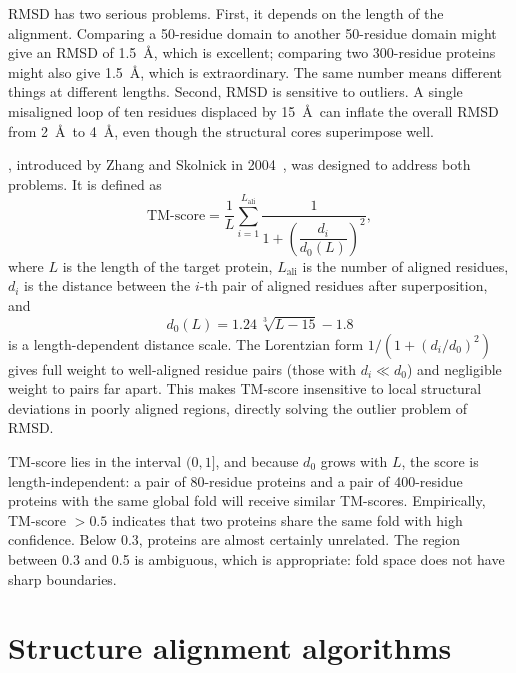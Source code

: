 RMSD has two serious problems. First, it depends on the length of the alignment.
Comparing a 50-residue domain to another 50-residue domain might give an RMSD of
1.5~\AA, which is excellent; comparing two 300-residue proteins might also give
1.5~\AA, which is extraordinary. The same number means different things at
different lengths. Second, RMSD is sensitive to outliers. A single misaligned loop
of ten residues displaced by 15~\AA\ can inflate the overall RMSD from 2~\AA\ to
4~\AA, even though the structural cores superimpose well.

, introduced by Zhang and Skolnick in
2004~\cite{zhang2005}, was designed to address both problems. It is defined as
\begin{equation}
\label{eq:tmscore}
\text{TM-score} = \frac{1}{L}\sum_{i=1}^{L_{\text{ali}}}
  \frac{1}{1 + \left(\dfrac{d_i}{d_0(L)}\right)^2},
\end{equation}
where $L$ is the length of the target protein, $L_{\text{ali}}$ is the number of
aligned residues, $d_i$ is the distance between the $i$-th pair of aligned
residues after superposition, and
\begin{equation}
\label{eq:d0}
d_0(L) = 1.24\,\sqrt[3]{L - 15} - 1.8
\end{equation}
is a length-dependent distance scale. The Lorentzian form
$1/(1+(d_i/d_0)^2)$ gives full weight to well-aligned residue pairs (those with
$d_i \ll d_0$) and negligible weight to pairs far apart. This makes TM-score
insensitive to local structural deviations in poorly aligned regions, directly
solving the outlier problem of RMSD.

TM-score lies in the interval $(0, 1]$, and because $d_0$ grows with $L$, the
score is length-independent: a pair of 80-residue proteins and a pair of
400-residue proteins with the same global fold will receive similar TM-scores.
Empirically, TM-score $> 0.5$ indicates that two proteins share the same fold
with high confidence. Below 0.3, proteins are almost certainly unrelated. The
region between 0.3 and 0.5 is ambiguous, which is appropriate: fold space does
not have sharp boundaries.


\section{Structure alignment algorithms}
\label{sec:alignment_algorithms}

